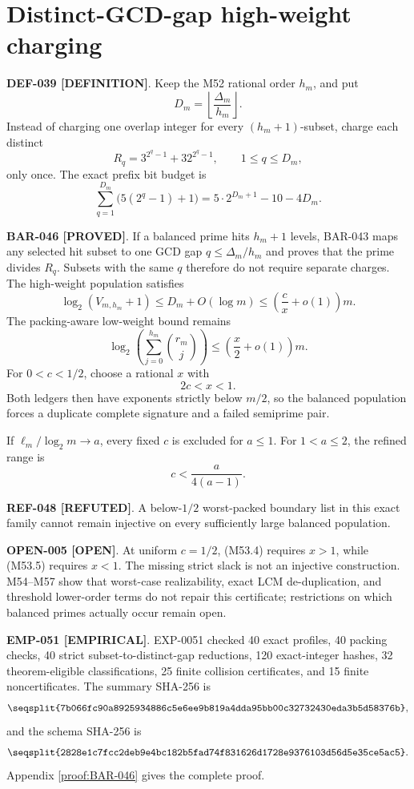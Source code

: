 \documentclass[11pt]{article}
\newcommand{\claimstatus}[2]{\textbf{#1 [#2]}}
\begin{document}
\section{Distinct-GCD-gap high-weight charging}

\claimstatus{DEF-039}{DEFINITION}. Keep the M52 rational order \(h_m\), and
put
\[
D_m=\left\lfloor\frac{\Delta_m}{h_m}\right\rfloor.
\tag{M53.1}
\]
Instead of charging one overlap integer for every
\((h_m+1)\)-subset, charge each distinct
\[
R_q=3^{2^q-1}+32^{2^q-1},
\qquad 1\le q\le D_m,
\tag{M53.2}
\]
only once. The exact prefix bit budget is
\[
\sum_{q=1}^{D_m}\bigl(5(2^q-1)+1\bigr)
=5\cdot2^{D_m+1}-10-4D_m.
\tag{M53.3}
\]

\claimstatus{BAR-046}{PROVED}. If a balanced prime hits \(h_m+1\) levels,
BAR-043 maps any selected hit subset to one GCD gap
\(q\le\Delta_m/h_m\) and proves that the prime divides \(R_q\). Subsets
with the same \(q\) therefore do not require separate charges. The
high-weight population satisfies
\[
\log_2(V_{m,h_m}+1)
\le D_m+O(\log m)
\le\left(\frac{c}{x}+o(1)\right)m.
\tag{M53.4}
\]
The packing-aware low-weight bound remains
\[
\log_2\left(\sum_{j=0}^{h_m}\binom{r_m}{j}\right)
\le\left(\frac{x}{2}+o(1)\right)m.
\tag{M53.5}
\]
For \(0<c<1/2\), choose a rational \(x\) with
\[
2c<x<1.
\tag{M53.6}
\]
Both ledgers then have exponents strictly below \(m/2\), so the balanced
population forces a duplicate complete signature and a failed semiprime
pair.

If \(\ell_m/\log_2m\to a\), every fixed \(c\) is excluded for \(a\le1\).
For \(1<a\le2\), the refined range is
\[
c<\frac{a}{4(a-1)}.
\tag{M53.7}
\]

\claimstatus{REF-048}{REFUTED}. A below-\(1/2\) worst-packed boundary list
in this exact family cannot remain injective on every sufficiently large
balanced population.

\claimstatus{OPEN-005}{OPEN}. At uniform \(c=1/2\), (M53.4) requires
\(x>1\), while (M53.5) requires \(x<1\). The missing strict slack is not an
injective construction. M54--M57 show that worst-case realizability,
exact LCM de-duplication, and threshold lower-order terms do not repair this
certificate; restrictions on which balanced primes actually occur remain
open.

\claimstatus{EMP-051}{EMPIRICAL}. EXP-0051 checked 40 exact profiles, 40
packing checks, 40 strict subset-to-distinct-gap reductions, 120
exact-integer hashes, 32 theorem-eligible classifications, 25 finite
collision certificates, and 15 finite noncertificates. The summary SHA-256
is
\[
\texttt{\seqsplit{7b066fc90a8925934886c5e6ee9b819a4dda95bb00c32732430eda3b5d58376b}},
\]
and the schema SHA-256 is
\[
\texttt{\seqsplit{2828e1c7fcc2deb9e4bc182b5fad74f831626d1728e9376103d56d5e35ce5ac5}}.
\]
Appendix \ref{proof:BAR-046} gives the complete proof.
\end{document}
